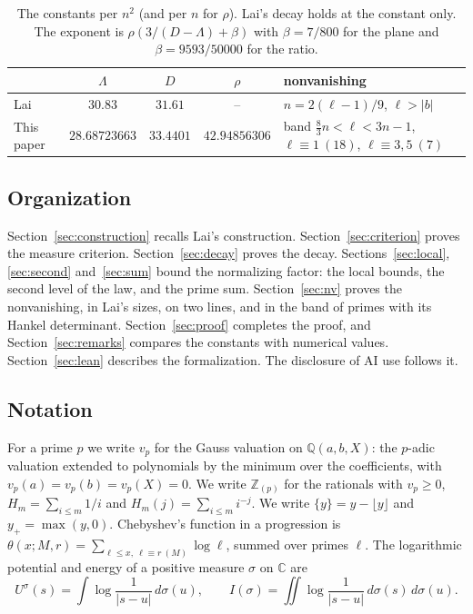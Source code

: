 \documentclass[11pt]{amsart}
\theoremstyle{definition}
\theoremstyle{remark}
\numberwithin{equation}{section}
\newcommand{\Z}{\mathbb Z}
\newcommand{\Q}{\mathbb Q}
\newcommand{\C}{\mathbb C}
\newcommand{\fr}[1]{\{#1\}}
\begin{document}
\begin{table}[ht]
\centering
\renewcommand{\arraystretch}{1.2}
\setlength{\tabcolsep}{4pt}
\begin{tabular}{@{}lccc>{\raggedright\arraybackslash}p{4.4cm}@{}}
\toprule
 & $\Lambda$ & $D$ & $\rho$ & nonvanishing\\
\midrule
Lai \cite{Lai2026} & $30.83$ & $31.61$ & -- & $n=2(\ell-1)/9$, $\ell>|b|$\\
This paper & $28.68723663$ & $33.4401$ & $42.94856306$ & band $\frac83n<\ell<3n-1$, $\ell\equiv1\ (18)$, $\ell\equiv3,5\ (7)$\\
\bottomrule
\end{tabular}
\caption{The constants per $n^2$ (and per $n$ for $\rho$). Lai's decay holds at the constant only. The exponent is
$\rho(3/(D-\Lambda)+\beta)$ with $\beta=7/800$ for the plane and $\beta=9593/50000$ for the ratio.}\label{tab:constants}
\end{table}

\subsection{Organization}
Section~\ref{sec:construction} recalls Lai's construction. Section~\ref{sec:criterion} proves the measure criterion.
Section~\ref{sec:decay} proves the decay. Sections~\ref{sec:local}, \ref{sec:second} and~\ref{sec:sum} bound the
normalizing factor: the local bounds, the second level of the law, and the prime sum. Section~\ref{sec:nv} proves the
nonvanishing, in Lai's sizes, on two lines, and in the band of primes with its Hankel determinant. Section~\ref{sec:proof} completes the proof, and Section~\ref{sec:remarks} compares the constants with
numerical values. Section~\ref{sec:lean} describes the formalization. The disclosure of AI use follows it.

\subsection{Notation}
For a prime $p$ we write $v_p$ for the Gauss valuation on $\Q(a,b,X)$: the $p$-adic valuation extended to
polynomials by the minimum over the coefficients, with $v_p(a)=v_p(b)=v_p(X)=0$. We write $\Z_{(p)}$ for the
rationals with $v_p\ge0$, $H_m=\sum_{i\le m}1/i$ and $H_m(j)=\sum_{i\le m}i^{-j}$. We write $\fr y=y-\lfloor y\rfloor$
and $y_+=\max(y,0)$. Chebyshev's function in a progression is $\theta(x;M,r)=\sum_{\ell\le x,\ \ell\equiv r\ (M)}\log\ell$,
summed over primes $\ell$. The logarithmic potential and energy of a positive measure $\sigma$ on $\C$ are
\[
 U^\sigma(s)=\int\log\frac1{|s-u|}\,d\sigma(u),\qquad I(\sigma)=\iint\log\frac1{|s-u|}\,d\sigma(s)\,d\sigma(u).
\]
\end{document}
